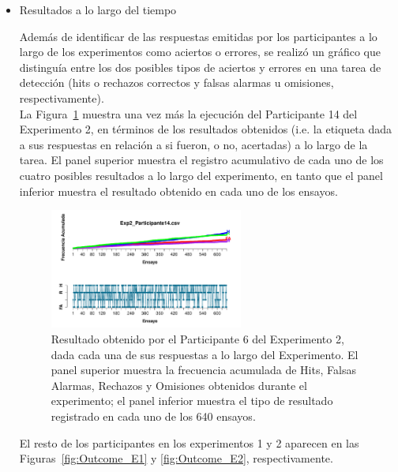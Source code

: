 \begin{itemize}
\item Resultados a lo largo del tiempo

Además de identificar de las respuestas emitidas por los participantes a lo largo de los experimentos como aciertos o errores, se realizó un gráfico que distinguía entre los dos posibles tipos de aciertos y errores en una tarea de detección (hits o rechazos correctos y falsas alarmas u omisiones, respectivamente).\\ 

La Figura~\ref{fig:Outcome_E1_P14} muestra una vez más la ejecución del Participante 14 del Experimento 2, en términos de los resultados obtenidos (i.e. la etiqueta dada a sus respuestas en relación a si fueron, o no, acertadas) a lo largo de la tarea. El panel superior muestra el registro acumulativo de cada uno de los cuatro posibles resultados a lo largo del experimento, en tanto que el panel inferior muestra el resultado obtenido en cada uno de los ensayos.\\ 

\begin{figure}[th]
\centering
\includegraphics[width=0.60\textwidth]{Figures/Outcome_Exp2_P14}
\caption[Resultado obtenido a lo largo del tiempo: Ejemplo]{Resultado obtenido por el Participante 6 del Experimento 2, dada cada una de sus respuestas a lo largo del Experimento. El panel superior muestra la frecuencia acumulada de Hits, Falsas Alarmas, Rechazos y Omisiones obtenidos durante el experimento; el panel inferior muestra el tipo de resultado registrado en cada uno de los 640 ensayos.}
\label{fig:Outcome_E1_P14}
\end{figure}

El resto de los participantes en los experimentos 1 y 2 aparecen en las Figuras~\ref{fig:Outcome_E1} y \ref{fig:Outcome_E2}, respectivamente.\\

\end{itemize}











